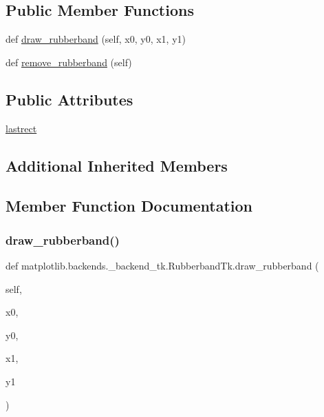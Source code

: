 \subsection*{Public Member Functions}
\begin{DoxyCompactItemize}
\item 
def \hyperlink{classmatplotlib_1_1backends_1_1__backend__tk_1_1RubberbandTk_aab5c776d5d8f74cace7c183175fbc72f}{draw\+\_\+rubberband} (self, x0, y0, x1, y1)
\item 
def \hyperlink{classmatplotlib_1_1backends_1_1__backend__tk_1_1RubberbandTk_a9b7166b29ff40958141295be059a98a3}{remove\+\_\+rubberband} (self)
\end{DoxyCompactItemize}
\subsection*{Public Attributes}
\begin{DoxyCompactItemize}
\item 
\hyperlink{classmatplotlib_1_1backends_1_1__backend__tk_1_1RubberbandTk_a8bdd2c0c4fa2ce1cd6560a4ce6fa23a0}{lastrect}
\end{DoxyCompactItemize}
\subsection*{Additional Inherited Members}


\subsection{Member Function Documentation}
\mbox{\label{classmatplotlib_1_1backends_1_1__backend__tk_1_1RubberbandTk_aab5c776d5d8f74cace7c183175fbc72f}} 
\subsubsection{\texorpdfstring{draw\+\_\+rubberband()}{draw\_rubberband()}}
{\footnotesize\ttfamily def matplotlib.\+backends.\+\_\+backend\+\_\+tk.\+Rubberband\+Tk.\+draw\+\_\+rubberband (\begin{DoxyParamCaption}\item[{}]{self,  }\item[{}]{x0,  }\item[{}]{y0,  }\item[{}]{x1,  }\item[{}]{y1 }\end{DoxyParamCaption})}

